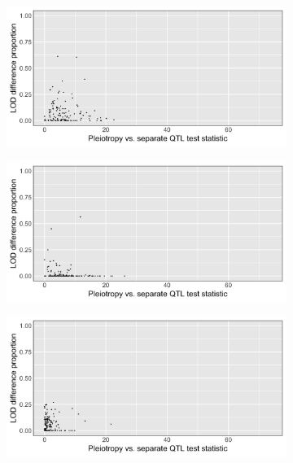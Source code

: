 \documentclass{article}
\begin{document}
\begin{figure}
\begin{subfigure}[t]{.38\textwidth}
\caption{}\label{fig:fig_h}
\end{subfigure}
\begin{subfigure}[t]{.38\textwidth}
\centering
\vspace{0pt}%
\includegraphics[width=\linewidth]{bar_9.jpg}
\caption{}\label{fig:fig_i}
\end{subfigure}
\begin{subfigure}[t]{.38\textwidth}
\centering
\vspace{0pt}%
\includegraphics[width=\linewidth]{bar_10.jpg}
\caption{}\label{fig:fig_j}
\end{subfigure}
\begin{subfigure}[t]{.38\textwidth}
\centering
\vspace{0pt}%
\includegraphics[width=\linewidth]{bar_11.jpg}

\end{subfigure}
\end{figure}
\end{document}
